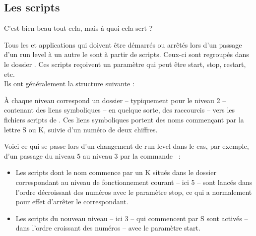 \subsection{Les scripts}
C'est bien beau tout cela, mais à quoi cela sert ?\par
Tous les  et applications qui doivent être démarrés ou arrêtés lors d'un passage d'un run level à un autre le sont à partir de scripts. Ceux-ci sont regroupés dans le dossier . Ces scripts reçoivent un paramètre qui peut être start, stop, restart, etc.\\
Ils ont généralement la structure suivante :\par
{}
À chaque niveau correspond un dossier -- typiquement  pour le niveau 2 -- contenant des liens symboliques -- en quelque sorte, des raccourcis -- vers les fichiers scripts de . Ces liens symboliques portent des noms commençant par la lettre S ou K, suivie d'un numéro de deux chiffres.\par
Voici ce qui se passe lors d'un changement de run level dans le cas, par exemple, d'un passage du niveau 5 au niveau 3 par la commande ~:\par
\begin{itemize}
\item Les scripts dont le nom commence par un K situés dans le dossier correspondant au niveau de fonctionnement courant -- ici 5 -- sont lancés dans l'ordre décroissant des numéros avec le paramètre stop, ce qui a normalement pour effet d'arrêter le  correspondant. 
\item Les scripts du nouveau niveau -- ici 3 -- qui commencent par S sont activés -- dans l'ordre croissant des numéros -- avec le paramètre start. 
\end{itemize}
